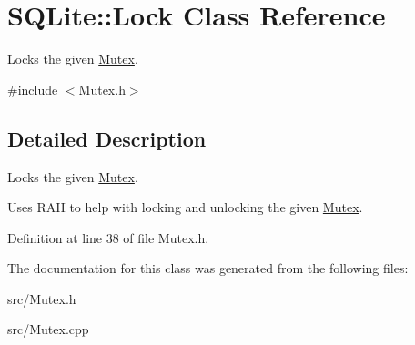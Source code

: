 \hypertarget{a00004}{\section{S\-Q\-Lite\-:\-:Lock Class Reference}
\label{a00004}
}


Locks the given \hyperlink{a00005}{Mutex}.  




{\ttfamily \#include $<$Mutex.\-h$>$}



\subsection{Detailed Description}
Locks the given \hyperlink{a00005}{Mutex}. 

Uses R\-A\-I\-I to help with locking and unlocking the given \hyperlink{a00005}{Mutex}. 

Definition at line 38 of file Mutex.\-h.



The documentation for this class was generated from the following files\-:\begin{DoxyCompactItemize}
\item 
src/Mutex.\-h\item 
src/Mutex.\-cpp\end{DoxyCompactItemize}
